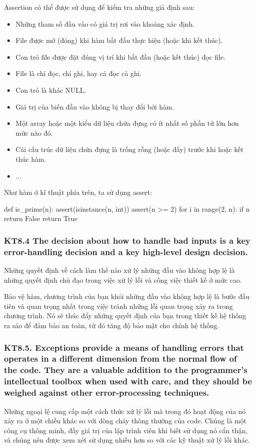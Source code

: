 \documentclass[12pt]{report}
\begin{document}
Assertion có thể được sử dụng để kiểm tra những giả định sau: 
\begin{itemize}
	\item Những tham số đầu vào có giá trị rơi vào khoảng xác định.
	\item File được mở (đóng) khi hàm bắt đầu thực hiện (hoặc khi kết thúc). 
	\item Con trỏ file được đặt đúng vị trí khi bắt đầu (hoặc kết thúc) đọc file. 
	\item File là chỉ đọc, chỉ ghi, hay cả đọc cả ghi. 
	\item Con trỏ là khác NULL.
	\item Giá trị của biến đầu vào không bị thay đổi bởi hàm. 
	\item Một array hoặc một kiểu dữ liệu chứa đựng có ít nhất số phần tử lớn hơn mức nào đó. 
	\item Cái cấu trúc dữ liệu chứa đựng là trống rỗng (hoặc đầy) trước khi hoặc kết thúc hàm.
	\item ...
\end{itemize}
Như hàm ở kĩ thuật phía trên, ta sử dụng assert:
\begin{python}
def is_prime(n):
	assert(isinstance(n, int))
	assert(n >= 2)
	for i in range(2, n):
		if n %
			return False
	return True 
\end{python}

\subsubsection{KT8.4 The decision about how to handle bad inputs is a key error-handling decision and a key high-level design decision.}
Những quyết định về cách làm thế nào xử lý những đầu vào không hợp lệ là những quyết định chủ đạo trong việc xử lý lỗi và công việc thiết kế ở mức cao. 
\vspace*{3mm}

Bảo vệ hàm, chương trình của bạn khỏi những đầu vào không hợp lệ là bước đầu tiên và quan trọng nhất trong việc tránh những lỗi quan trọng xảy ra trong chương trình. Nó sẽ thúc đẩy những quyết định của bạn trong thiết kế hệ thống ra sảo để đảm bảo an toàn, từ đó tăng độ bảo mật cho chính hệ thống. 

\subsubsection{KT8.5. Exceptions provide a means of handling errors that operates in a different dimension from the normal flow of the code. They are a valuable addition to the programmer's intellectual toolbox when used with care, and they should be weighed against other error-processing techniques.}
Những ngoại lệ cung cấp một cách thức xử lý lỗi mà trong đó hoạt động của nó xảy ra ở một chiều khác so với dòng chảy thông thường của code. Chúng là một công cụ thông minh, đầy giá trị của lập trình viên khi biết sử dụng nó cẩn thận, và chúng nên được xem xét sử dụng nhiều hơn so với các kỹ thuật xử lý lỗi khác. 
\vspace*{3mm}
\end{document}
